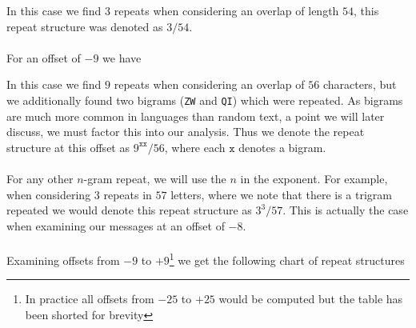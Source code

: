 In this case we find $3$ repeats when considering an overlap of
length $54$, this repeat structure was denoted as $3/54$.
\\\\For an offset of $-9$ we have
\begin{center}
\end{center}
In this case we find $9$ repeats when considering an overlap of
$56$ characters, but we additionally found two bigrams (\texttt{ZW}
and \texttt{QI}) which were repeated. As bigrams are much more
common in languages than random text, a point we will later
discuss, we must factor this into our analysis. Thus we denote the
repeat structure at this offset as $9^{\texttt{xx}}/56$, where each
$\texttt{x}$ denotes a bigram.\\\\For any other $n$-gram repeat, we
will use the $n$ in the exponent. For example, when considering $3$
repeats in $57$ letters, where we note that there is a trigram
repeated we would denote this repeat structure as $3^{3}/57$. This
is actually the case when examining our messages at an offset of $-8$.
\\\\Examining offsets from $-9$ to $+9$\footnote{In practice all
	offsets from $-25$ to $+25$ would be computed but the table has
	been shorted for brevity} we get the following chart of repeat structures
